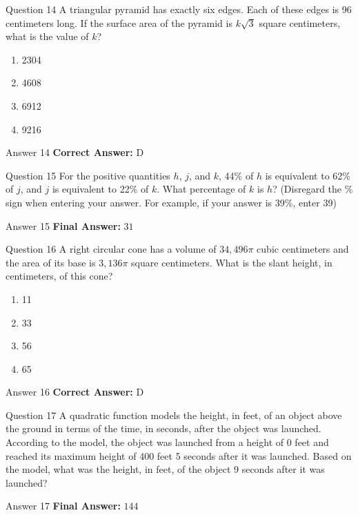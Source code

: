 \documentclass{beamer}
\begin{document}
\begin{frame}{Question 14}
\small
A triangular pyramid has exactly six edges. Each of these edges is 96 centimeters long.  
If the surface area of the pyramid is $k\sqrt{3}$ square centimeters, what is the value of $k$?
\vspace{0.35cm}
\begin{enumerate}
    \item[A.] 2304
    \item[B.] 4608
    \item[C.] 6912
    \item[D.] 9216
\end{enumerate}
\end{frame}
\begin{frame}{Answer 14}
\small
\textbf{Correct Answer:} D
\end{frame}

\begin{frame}{Question 15}
\small
For the positive quantities $h$, $j$, and $k$, 44\% of $h$ is equivalent to 62\% of $j$, and $j$ is equivalent to 22\% of $k$.  
What percentage of $k$ is $h$?  
(Disregard the \% sign when entering your answer. For example, if your answer is 39\%, enter 39)
\end{frame}
\begin{frame}{Answer 15}
\small
\textbf{Final Answer:} $\boxed{31}$
\end{frame}

\begin{frame}{Question 16}
\small
A right circular cone has a volume of $34{,}496\pi$ cubic centimeters and the area of its base is $3{,}136\pi$ square centimeters.  
What is the slant height, in centimeters, of this cone?
\vspace{0.35cm}
\begin{enumerate}
    \item[A.] 11
    \item[B.] 33
    \item[C.] 56
    \item[D.] 65
\end{enumerate}
\end{frame}
\begin{frame}{Answer 16}
\small
\textbf{Correct Answer:} D
\end{frame}

\begin{frame}{Question 17}
\small
A quadratic function models the height, in feet, of an object above the ground in terms of the time, in seconds, after the object was launched.  
According to the model, the object was launched from a height of 0 feet and reached its maximum height of 400 feet 5 seconds after it was launched.  
Based on the model, what was the height, in feet, of the object 9 seconds after it was launched?
\end{frame}
\begin{frame}{Answer 17}
\small
\textbf{Final Answer:} $\boxed{144}$
\end{frame}
\end{document}
